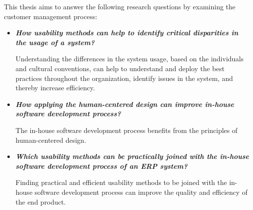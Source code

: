 \documentclass[12pt,a4paper,oneside,pdftex]{report}
\begin{document}
This thesis aims to answer the following research questions by examining the customer management process:

\begin{itemize}
\item \textbf{\emph{How usability methods can help to identify critical disparities in the usage of a system?}}

Understanding the differences in the system usage, based on the individuals and cultural conventions, can help to understand and deploy the best practices throughout the organization, identify issues in the system, and thereby increase efficiency.

\item \textbf{\emph{How applying the human-centered design can improve in-house software development process?}}

The in-house software development process benefits from the principles of human-centered design.

\item \textbf{\emph{Which usability methods can be practically joined with the in-house software development process of an ERP system?}}

Finding practical and efficient usability methods to be joined with the in-house software development process can improve the quality and efficiency of the end product.

\end{itemize}




\end{document}
